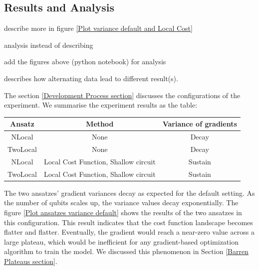 \subsection{Results and Analysis}

\begin{todolist}
\item describe more in figure \ref{Plot variance default and Local Cost}
\item analysis instead of describing
\item add the figures above (python notebook) for analysis
\item describes how alternating data lead to different result(s).
\end{todolist}

The section \ref{Development Process section} discusses the configurations of the experiment. 
We summarise the experiment results as the table:
\begin{center}
    \begin{tabular}{|| c c c ||}
        \hline
        Ansatz      & Method                                & Variance of gradients \\[0.5ex] 
        \hline \hline
        NLocal      & None                                  & Decay                 \\
        \hline
        TwoLocal    & None                                  & Decay                 \\
        \hline
        NLocal      & Local Cost Function, Shallow circuit  & Sustain               \\
        \hline
        TwoLocal    & Local Cost Function, Shallow circuit  & Sustain               \\
        \hline
    \end{tabular}
\end{center}

The two ansatzes' gradient variances decay as expected for the default setting.
As the number of qubits scales up, the variance values decay exponentially. 
The figure \ref{Plot ansatzes variance default} shows the results of the two ansatzes in this configuration.
This result indicates that the cost function landscape becomes flatter and flatter. 
Eventually, the gradient would reach a near-zero value across a large plateau, which would be inefficient for any gradient-based optimization algorithm to train the model.
We discussed this phenomenon in Section \ref{Barren Plateaus section}.


